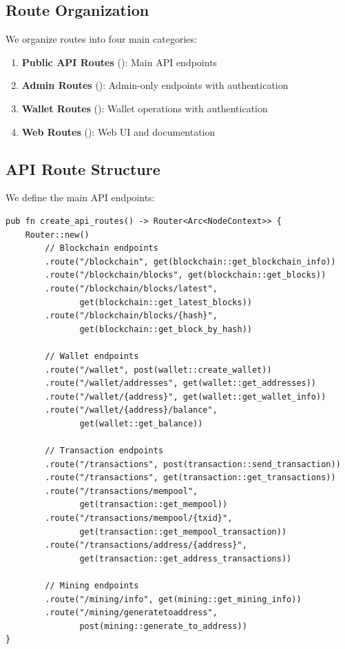 \subsection{Route Organization}

We organize routes into four main categories:

\begin{enumerate}
  \item \textbf{Public API Routes} (): Main API endpoints
  \item \textbf{Admin Routes} (): Admin-only endpoints with authentication
  \item \textbf{Wallet Routes} (): Wallet operations with authentication
  \item \textbf{Web Routes} (\code{/}): Web UI and documentation
\end{enumerate}

\subsection{API Route Structure}

We define the main API endpoints:

\begin{listing}[htbp]
\caption{Main API route definitions}
\label{lst:api-routes}
\begin{verbatim}
pub fn create_api_routes() -> Router<Arc<NodeContext>> {
    Router::new()
        // Blockchain endpoints
        .route("/blockchain", get(blockchain::get_blockchain_info))
        .route("/blockchain/blocks", get(blockchain::get_blocks))
        .route("/blockchain/blocks/latest",
               get(blockchain::get_latest_blocks))
        .route("/blockchain/blocks/{hash}",
               get(blockchain::get_block_by_hash))

        // Wallet endpoints
        .route("/wallet", post(wallet::create_wallet))
        .route("/wallet/addresses", get(wallet::get_addresses))
        .route("/wallet/{address}", get(wallet::get_wallet_info))
        .route("/wallet/{address}/balance",
               get(wallet::get_balance))

        // Transaction endpoints
        .route("/transactions", post(transaction::send_transaction))
        .route("/transactions", get(transaction::get_transactions))
        .route("/transactions/mempool",
               get(transaction::get_mempool))
        .route("/transactions/mempool/{txid}",
               get(transaction::get_mempool_transaction))
        .route("/transactions/address/{address}",
               get(transaction::get_address_transactions))

        // Mining endpoints
        .route("/mining/info", get(mining::get_mining_info))
        .route("/mining/generatetoaddress",
               post(mining::generate_to_address))
}
\end{verbatim}
\end{listing}

